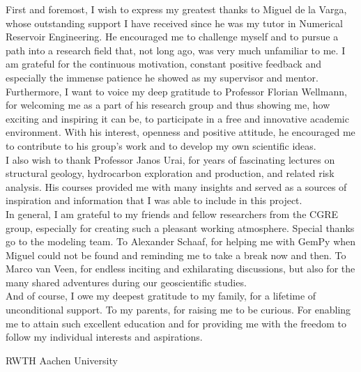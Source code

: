 \documentclass[a4paper,11pt]{MScThesis}
\begin{document}
    \cleardoublepage
%
    First and foremost, I wish to express my greatest thanks to Miguel de la Varga, whose outstanding support I have received since he was my tutor in Numerical Reservoir Engineering. He encouraged me to challenge myself and to pursue a path into a research field that, not long ago, was very much unfamiliar to me. I am grateful for the continuous motivation, constant positive feedback and especially the immense patience he showed as my supervisor and mentor.\\
    Furthermore, I want to voice my deep gratitude to Professor Florian Wellmann, for welcoming me as a part of his research group and thus showing me, how exciting and inspiring it can be, to participate in a free and innovative academic environment. With his interest, openness and positive attitude, he encouraged me to contribute to his group's work and to develop my own scientific ideas.\\
    I also wish to thank Professor Janos Urai, for years of fascinating lectures on structural geology, hydrocarbon exploration and production, and related risk analysis. His courses provided me with many insights and served as a sources of inspiration and information that I was able to include in this project.\\
    In general, I am grateful to my friends and fellow researchers from the CGRE group, especially for creating such a pleasant working atmosphere. Special thanks go to the modeling team. To Alexander Schaaf, for helping me with GemPy when Miguel could not be found and reminding me to take a break now and then. To Marco van Veen, for endless inciting and exhilarating discussions, but also for the many shared adventures during our geoscientific studies.\\
    And of course, I owe my deepest gratitude to my family, for a lifetime of unconditional support. To my parents, for raising me to be curious. For enabling me to attain such excellent education and for providing me with the freedom to follow my individual interests and aspirations.
    \vspace*{15mm}

    \noindent 
    RWTH Aachen University \hfill \mscname\\ %
    \mscdate

%
    \tocloflot
%
%
    \begin{acronym}%
    \end{acronym}%
    \cleardoublepage%
%
%
%
\mainmatter
%
\end{document}
